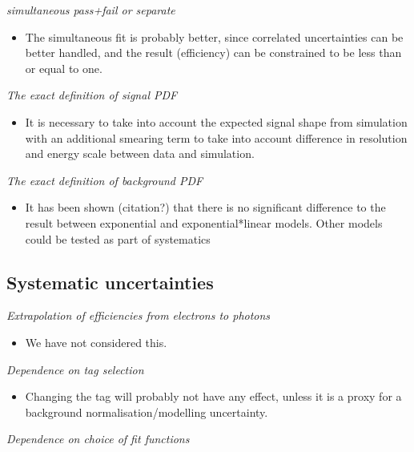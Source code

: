 \documentclass[11pt,a4paper]{article}
\begin{document}
{\it simultaneous pass+fail or separate}

\begin{itemize}
    \item The simultaneous fit is probably better, since correlated uncertainties
can be better handled, and the result (efficiency) can be constrained to be 
less than or equal to one.
\end{itemize}

{\it The exact definition of signal PDF} \\

\begin{itemize}
    \item It is necessary to take into account the expected signal shape 
from simulation with an additional smearing term to take into account difference in 
resolution and energy scale between data and simulation.
\end{itemize}


{\it The exact definition of background PDF} \\

\begin{itemize}
    \item  It has been shown (citation?) that there is no significant difference to
the result between exponential and exponential*linear models.  Other models 
could be tested as part of systematics
\end{itemize}


\subsection{Systematic uncertainties}

{\it Extrapolation of efficiencies from electrons to photons} \\

\begin{itemize}    
    \item We have not considered this.
\end{itemize}

{\it Dependence on tag selection} \\

\begin{itemize}
    \item Changing the tag will probably not have any effect, unless it is a
proxy for a background normalisation/modelling uncertainty.
\end{itemize}

{\it Dependence on choice of fit functions} \\
\end{document}

